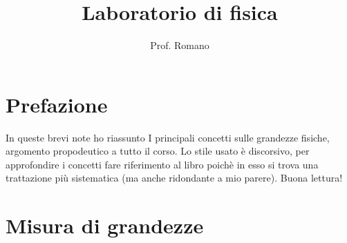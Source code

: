 \documentclass[12pt,a4paper,oneside]{book}
\title{Laboratorio di fisica}
\author{Prof. Romano}
\theoremstyle{esercizio}
\begin{document}
\maketitle
\tableofcontents
\chapter*{Prefazione}
In queste brevi note ho riassunto I principali concetti sulle grandezze fisiche, argomento propodeutico a tutto il corso. Lo stile usato è discorsivo, per approfondire i concetti fare riferimento al libro poichè in esso si trova una trattazione più sistematica (ma anche ridondante a mio parere). Buona lettura!
\chapter{Misura di grandezze}
\end{document}
